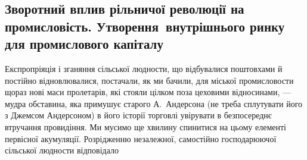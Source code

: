 \subsection {Зворотний вплив рільничої революції на промисловість.
Утворення~внутрішнього ринку для промислового капіталу}

Експропріяція і зганяння сільської людности, що відбувалися
поштовхами й постійно відновлювалися, постачали, як ми бачили,
для міської промисловости щораз нові маси пролетарів, які
стояли цілком поза цеховими відносинами, — мудра обставина,
яка примушує старого А.~Андерсона (не треба сплутувати його
з Джемсом Андерсоном) в його історії торговлі увірувати в безпосереднє
втручання провидіння. Ми мусимо ще хвилину спинитися
на цьому елементі первісної акумуляції. Розрідженню незалежної,
самостійно господарюючої сільської людности відповідало
\parbreak{}  %
